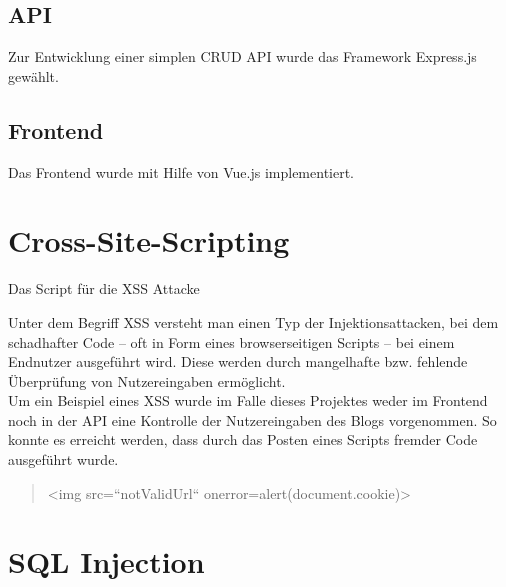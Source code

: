 \subsection{API}
Zur Entwicklung einer simplen CRUD API wurde das Framework Express.js gewählt. 
\subsection{Frontend}
Das Frontend wurde mit Hilfe von Vue.js implementiert.
\section{Cross-Site-Scripting}
Das Script für die \ac{XSS} Attacke

Unter dem Begriff \ac{XSS} versteht man einen Typ der Injektionsattacken, bei dem schadhafter Code – oft in Form eines browserseitigen Scripts – bei einem Endnutzer ausgeführt wird. Diese werden durch mangelhafte bzw. fehlende Überprüfung von Nutzereingaben ermöglicht. \\
Um ein Beispiel eines \ac{XSS} wurde im Falle dieses Projektes weder im Frontend noch in der API eine Kontrolle der Nutzereingaben des Blogs vorgenommen. So konnte es erreicht werden, dass durch das Posten eines Scripts fremder Code ausgeführt wurde. 

\begin{quotation}
	<img src=``notValidUrl`` onerror=alert(document.cookie)>
\end{quotation}


\section{SQL Injection}